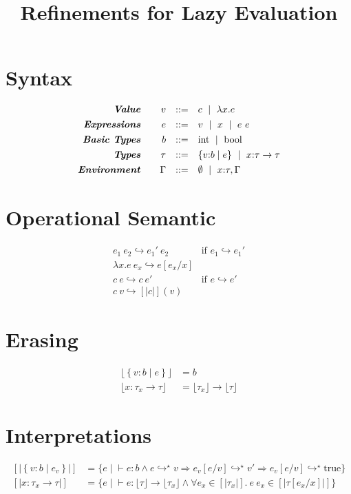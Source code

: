 \documentclass[10pt,a4paper]{article}
\title{Refinements for Lazy Evaluation}
\newcommand\efun[2]{\ensuremath{\lambda #1 . #2}}
\newcommand\eapp[2]{\ensuremath{#1 \ #2}}
\newcommand\etrue{\ensuremath{\text{true}}}
\newcommand\tint{\ensuremath{\text{int}}}
\newcommand\tbool{\ensuremath{\text{bool}}}
\newcommand\tref[3]{\ensuremath{\left\lbrace #1 \colon #2 \mid #3 \right\rbrace}}
\newcommand\tfun[3]{\ensuremath{#1\colon #2 \rightarrow #3}}
\newcommand\sub[2]{\ensuremath{\left[ #2 / #1 \right]}}
\newcommand\erase[1]{\ensuremath{\lfloor #1 \rfloor}}
\newcommand\interp[1]{\ensuremath{[|#1|]}}
\newcommand\eval[2]{\ensuremath{#1 \hookrightarrow #2}}
\newcommand\evals[2]{\ensuremath{#1 \hookrightarrow^\star #2}}
\newcommand\hastype[3]{\ensuremath{#1 \vdash #2 \colon #3}}
\begin{document}
\section*{Syntax}
$$
\begin{array}{rrcl}
\emphbf{Value} \quad 
  & v
  & ::= 
  &   	 c 
  \spmid \efun{x}{e} 
  \\[0.05in] 


\emphbf{Expressions} \quad 
  & e
  & ::= 
  &   	 v 
  \spmid x 
  \spmid \eapp{e}{e}    
  \\[0.05in] 

\emphbf{Basic Types} \quad 
  & b
  & ::=  
  & 	\tint \spmid \tbool
  \\[0.05in] 

\emphbf{Types} \quad 
  & \tau
  & ::=  
  & 	\tref{v}{b}{e}
  \spmid \tfun{x}{\tau}{\tau}    
  \\[0.05in] 

\emphbf{Environment} \quad 
  & \Gamma
  & ::= 
  &     \emptyset \spmid x\colon \tau, \Gamma

\end{array}
$$


\section*{Operational Semantic}

$$
\begin{array}{ll}
\eval{\eapp{e_1}{e_2}}{\eapp{e_1'}{e_2}} & \text{if } \eval{e_1}{e_1'}\\
\eval{\eapp{\efun{x}{e}}{e_x}}{e\sub{x}{e_x}} &\\
\eval{\eapp{c}{e}}{\eapp{c}{e'}} & \text{if } \eval{e}{e'}\\
\eval{\eapp{c}{v}}{[|c|](v)}
\end{array}
$$

\section*{Erasing}
\begin{align*}
\erase{\tref{v}{b}{e}}&=b\\
\erase{\tfun{x}{\tau_x}{\tau}}&= \erase{\tau_x} \rightarrow \erase{\tau}
\end{align*}

\section*{Interpretations}
\begin{align*}
\interp{\tref{v}{b}{e_v}} &= 
	\{e \mid \hastype{}{e}{b} 
	\land 
	\evals{e}{v} \Rightarrow 
	\evals{e_v\sub{v}{e}}{v'} \Rightarrow 
	\evals{e_v\sub{v}{e}}{\etrue} \}\\
\interp{\tfun{x}{\tau_x}{\tau}} &= 
	\{e \mid \hastype{}{e}{\erase{\tau} \rightarrow \erase{\tau_x}} 
	\land 
	\forall e_x \in \interp{\tau_x}. \
	 \eapp{e}{e_x} \in \interp{\tau\sub{x}{e_x}} 
	 \}
\end{align*}
\end{document}
